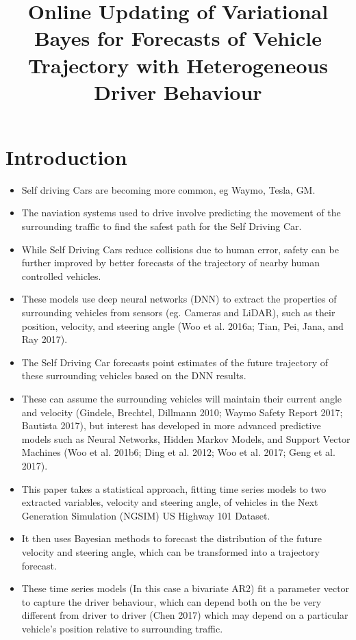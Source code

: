 \documentclass[12pt,a4paper]{article}\usepackage[]{graphicx}\usepackage[]{color}
\title{Online Updating of Variational Bayes for Forecasts of Vehicle Trajectory with Heterogeneous Driver Behaviour}
\begin{document}
\maketitle
\section{Introduction}

\begin{itemize}
\item Self driving Cars are becoming more common, eg Waymo, Tesla, GM.
\item The naviation systems used to drive involve predicting the movement of the surrounding traffic to find the safest path for the Self Driving Car.
\item While Self Driving Cars reduce collisions due to human error, safety can be further improved by better forecasts of the trajectory of nearby human controlled vehicles.
\item These models use deep neural networks (DNN) to extract the properties of surrounding vehicles from sensors (eg. Cameras and LiDAR), such as their position, velocity, and steering angle (Woo et al. 2016a; Tian, Pei, Jana, and Ray 2017).
\item The Self Driving Car forecasts point estimates of the future trajectory of these surrounding vehicles based on the DNN results.
\item These can assume the surrounding vehicles will maintain their current angle and velocity (Gindele, Brechtel, Dillmann 2010; Waymo Safety Report 2017; Bautista 2017), but interest has developed in more advanced predictive models such as Neural Networks, Hidden Markov Models, and Support Vector Machines (Woo et al. 201b6; Ding et al. 2012; Woo et al. 2017; Geng et al. 2017).
\item This paper takes a statistical approach, fitting time series models to two extracted variables, velocity and steering angle, of vehicles in the Next Generation Simulation (NGSIM) US Highway 101 Dataset.
\item It then uses Bayesian methods to forecast the distribution of the future velocity and steering angle, which can be transformed into a trajectory forecast.
\item These time series models (In this case a bivariate AR2) fit a parameter vector to capture the driver behaviour, which can depend both on the be very different from driver to driver (Chen 2017) which may depend on a particular vehicle's position relative to surrounding traffic.

\end{itemize}
\end{document}

